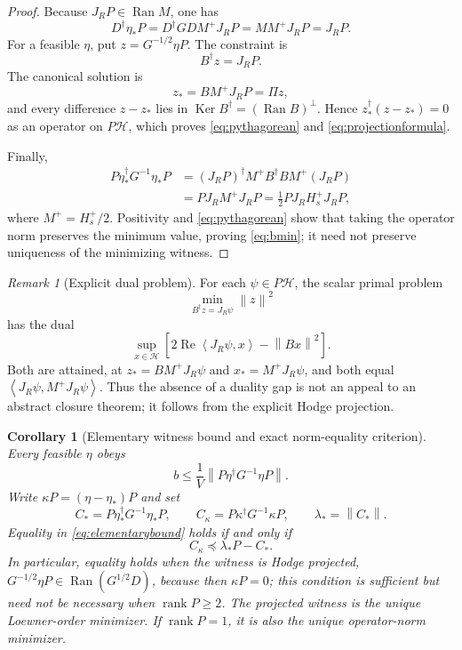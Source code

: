 \documentclass[11pt]{article}
\newtheorem{corollary}[theorem]{Corollary}
\theoremstyle{definition}
\theoremstyle{remark}
\newtheorem{remark}[theorem]{Remark}
\newcommand{\Ran}{\operatorname{Ran}}
\newcommand{\Ker}{\operatorname{Ker}}
\newcommand{\rank}{\operatorname{rank}}
\newcommand{\cH}{\mathcal H}
\newcommand{\norm}[1]{\left\lVert #1\right\rVert}
\newcommand{\ip}[2]{\left\langle #1,#2\right\rangle}
\begin{document}
\begin{proof}
Because $J_RP\in\Ran M$, one has
\[
 D^\dagger\eta_*P
 =D^\dagger GD M^+J_RP
 =MM^+J_RP
 =J_RP.
\]
For a feasible $\eta$, put $z=G^{-1/2}\eta P$.  The constraint is
\begin{equation}
 B^\dagger z=J_RP.
 \label{eq:Bconstraint}
\end{equation}
The canonical solution is
\[
 z_*=BM^+J_RP=\Pi z,
\]
and every difference $z-z_*$ lies in $\Ker B^\dagger=(\Ran B)^\perp$.  Hence $z_*^\dagger(z-z_*)=0$ as an operator on $P\cH$, which proves \eqref{eq:pythagorean} and \eqref{eq:projectionformula}.

Finally,
\begin{align}
 P\eta_*^\dagger G^{-1}\eta_*P
 &=(J_RP)^\dagger M^+B^\dagger BM^+(J_RP)\\
 &=PJ_RM^+J_RP
 =\frac12PJ_RH_s^+J_RP,
\end{align}
where $M^+=H_s^+/2$.  Positivity and \eqref{eq:pythagorean} show that taking the operator norm preserves the minimum value, proving \eqref{eq:bmin}; it need not preserve uniqueness of the minimizing witness.
\end{proof}

\begin{remark}[Explicit dual problem]
For each $\psi\in P\cH$, the scalar primal problem
\[
 \min_{B^\dagger z=J_R\psi}\norm z^2
\]
has the dual
\[
 \sup_{x\in\cH}
 \left[2\operatorname{Re}\ip{J_R\psi}{x}-\norm{Bx}^2\right].
\]
Both are attained, at $z_*=BM^+J_R\psi$ and $x_*=M^+J_R\psi$, and both equal
$\ip{J_R\psi}{M^+J_R\psi}$.  Thus the absence of a duality gap is not an appeal to an abstract closure theorem; it follows from the explicit Hodge projection.
\end{remark}

\begin{corollary}[Elementary witness bound and exact norm-equality criterion]
\label{cor:normequality}
Every feasible $\eta$ obeys
\begin{equation}
 \boxed{
 b\le\frac1V\norm{P\eta^\dagger G^{-1}\eta P}.}
 \label{eq:elementarybound}
\end{equation}
Write $\kappa P=(\eta-\eta_*)P$ and set
\begin{equation}
 C_*=P\eta_*^\dagger G^{-1}\eta_*P,
 \qquad
 C_\kappa=P\kappa^\dagger G^{-1}\kappa P,
 \qquad
 \lambda_*=\norm{C_*}.
 \label{eq:Cspectral}
\end{equation}
Equality in \eqref{eq:elementarybound} holds if and only if
\begin{equation}
 \boxed{C_\kappa\preceq \lambda_*P-C_*.}
 \label{eq:normequalitycriterion}
\end{equation}
In particular, equality holds when the witness is Hodge projected,
$G^{-1/2}\eta P\in\Ran(G^{1/2}D)$, because then $\kappa P=0$; this condition is sufficient but need not be necessary when $\rank P\ge2$.  The projected witness is the unique Loewner-order minimizer.  If $\rank P=1$, it is also the unique operator-norm minimizer.
\end{corollary}
\end{document}
